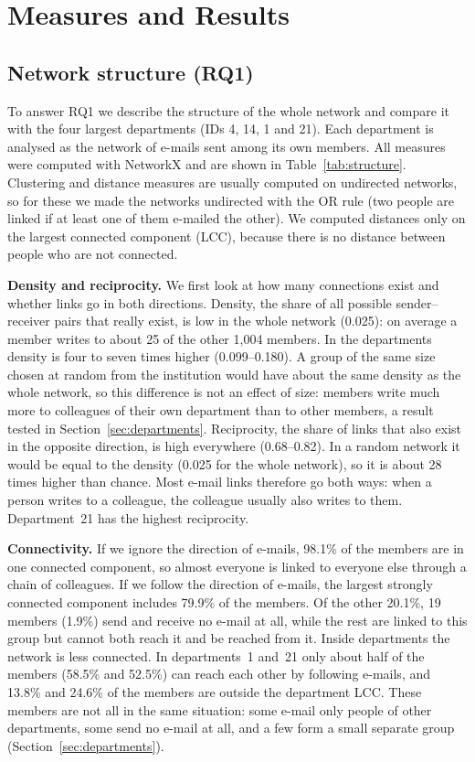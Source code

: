 \documentclass[12pt, a4paper]{article}
\begin{document}
\section{Measures and Results}
\label{measures}

\subsection{Network structure (RQ1)}
\label{sec:structure}

To answer RQ1 we describe the structure of the whole network and compare it
with the four largest departments (IDs 4, 14, 1 and 21). Each department is
analysed as the network of e-mails sent among its own members. All measures
were computed with NetworkX and are shown in Table~\ref{tab:structure}.
Clustering and distance measures are usually computed on undirected networks,
so for these we made the networks undirected with the OR rule (two people are
linked if at least one of them e-mailed the other). We computed distances only
on the largest connected component (LCC), because there is no distance between
people who are not connected.

\textbf{Density and reciprocity.} We first look at how many connections exist
and whether links go in both directions. Density, the share of all possible
sender--receiver pairs that really exist, is low in the whole network (0.025):
on average a member writes to about 25 of the other 1{,}004 members. In the
departments density is four to seven times higher (0.099--0.180). A group of
the same size chosen at random from the institution would have about the same
density as the whole network, so this difference is not an effect of size:
members write much more to colleagues of their own department than to other
members, a result tested in Section~\ref{sec:departments}. Reciprocity, the
share of links that also exist in the opposite direction, is high everywhere
(0.68--0.82). In a random network it would be equal to the density (0.025 for
the whole network), so it is about 28 times higher than chance. Most e-mail
links therefore go both ways: when a person writes to a colleague, the
colleague usually also writes to them. Department~21 has the highest
reciprocity.

\textbf{Connectivity.} If we ignore the direction of e-mails, 98.1\% of the
members are in one connected component, so almost everyone is linked to
everyone else through a chain of colleagues. If we follow the direction of
e-mails, the largest strongly connected component includes 79.9\% of the
members. Of the other 20.1\%, 19 members (1.9\%) send and receive no e-mail at
all, while the rest are linked to this group but cannot both reach it and be
reached from it. Inside departments the network is less connected. In
departments~1 and~21 only about half of the members (58.5\% and 52.5\%) can
reach each other by following e-mails, and 13.8\% and 24.6\% of the members
are outside the department LCC. These members are not all in the same
situation: some e-mail only people of other departments, some send no e-mail at
all, and a few form a small separate group (Section~\ref{sec:departments}).
\end{document}
